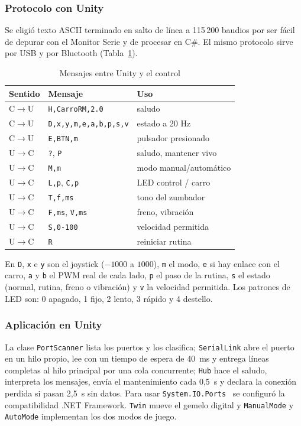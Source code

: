 \documentclass[journal]{IEEEtran}
\begin{document}
\subsubsection{Protocolo con Unity}
Se eligió texto ASCII terminado en salto de línea a 115\,200 baudios por ser fácil de depurar con el Monitor Serie y de procesar en C\#. El mismo protocolo sirve por USB y por Bluetooth (Tabla~\ref{tab:proto}).

\begin{table}[t]
\centering
\caption{Mensajes entre Unity y el control}
\label{tab:proto}
\begin{tabular}{@{}lll@{}}
\toprule
Sentido & Mensaje & Uso \\
\midrule
C$\rightarrow$U & \texttt{H,CarroRM,2.0} & saludo \\
C$\rightarrow$U & \texttt{D,x,y,m,e,a,b,p,s,v} & estado a 20 Hz \\
C$\rightarrow$U & \texttt{E,BTN,m} & pulsador presionado \\
U$\rightarrow$C & \texttt{?}, \texttt{P} & saludo, mantener vivo \\
U$\rightarrow$C & \texttt{M,m} & modo manual/automático \\
U$\rightarrow$C & \texttt{L,p}, \texttt{C,p} & LED control / carro \\
U$\rightarrow$C & \texttt{T,f,ms} & tono del zumbador \\
U$\rightarrow$C & \texttt{F,ms}, \texttt{V,ms} & freno, vibración \\
U$\rightarrow$C & \texttt{S,0-100} & velocidad permitida \\
U$\rightarrow$C & \texttt{R} & reiniciar rutina \\
\bottomrule
\end{tabular}
\end{table}

En \texttt{D}, \texttt{x} e \texttt{y} son el joystick ($-1000$ a $1000$), \texttt{m} el modo, \texttt{e} si hay enlace con el carro, \texttt{a} y \texttt{b} el PWM real de cada lado, \texttt{p} el paso de la rutina, \texttt{s} el estado (normal, rutina, freno o vibración) y \texttt{v} la velocidad permitida. Los patrones de LED son: 0 apagado, 1 fijo, 2 lento, 3 rápido y 4 destello.

\subsubsection{Aplicación en Unity}
La clase \texttt{PortScanner} lista los puertos y los clasifica; \texttt{SerialLink} abre el puerto en un hilo propio, lee con un tiempo de espera de 40~ms y entrega líneas completas al hilo principal por una cola concurrente; \texttt{Hub} hace el saludo, interpreta los mensajes, envía el mantenimiento cada 0,5~s y declara la conexión perdida si pasan 2,5~s sin datos. Para usar \texttt{System.IO.Ports}~\cite{ports} se configuró la compatibilidad .NET Framework. \texttt{Twin} mueve el gemelo digital y \texttt{ManualMode} y \texttt{AutoMode} implementan los dos modos de juego.
\end{document}

